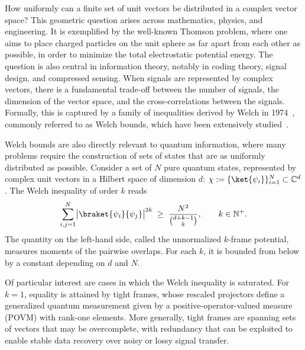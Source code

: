 \documentclass[aps,twocolumn,pra,superscriptaddress,nofootinbib]{revtex4-2}
\begin{document}
How uniformly can a finite set of unit vectors be distributed in a {complex vector space}? This geometric question arises across mathematics, physics, and engineering. {It is exemplified by the well-known Thomson problem, where one aims to place charged particles on the unit sphere as far apart from each other as possible, in order to minimize the total electrostatic potential energy. The question is also central in information theory, notably in coding theory, signal design, and compressed sensing. When signals are represented by complex vectors, there is a fundamental trade-off between the number of signals, the dimension of the vector space, and the cross-correlations between the signals. Formally, this is captured by a family of inequalities derived by Welch in 1974}~\cite{WelchBound}{, commonly referred to as Welch bounds, which have been extensively studied}~\cite{WelchBoundGeom(2012),Delsarte1977,haikin2018,Ulukus2002}.


{Welch bounds are also directly relevant to quantum information, where many problems require the construction of sets of states that are as uniformly distributed as possible. Consider a set of $N$ pure quantum states, represented by complex unit vectors in a Hilbert space of dimension $d$:} $\chi:=\{\ket{\psi_i}\}_{i=1}^N\subset\mathbb C^d$. The {Welch inequality of order $k$} reads
\[
  \sum_{i,j=1}^N \bigl|\braket{\psi_i}{\psi_j}\bigr|^{2k}
  \;\ge\; \frac{N^2}{\binom{d+k-1}{k}},\qquad k\in\mathbb N^+.
\]
{The quantity on the left-hand side}, called the {unnormalized} $k$-frame potential, {measures moments of the pairwise overlaps. For each $k$, it is bounded from below by a constant depending on $d$ and $N$.}

{Of particular interest are cases in which the Welch inequality is saturated.} For $k=1$, equality is attained by tight frames{, whose rescaled projectors define a generalized quantum measurement given by a positive-operator-valued measure (POVM) with rank-one elements. More generally, tight frames are spanning sets of vectors that may be overcomplete, with redundancy that can be exploited to enable stable data recovery over noisy or lossy signal transfer.}
\end{document}
